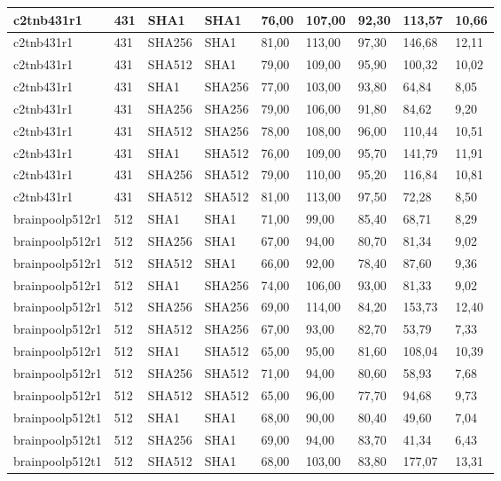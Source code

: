 \begin{longtable}{| l | l | l | l | l |l |l |l |l |}
c2tnb431r1 & 431 & SHA1 & SHA1 & 76,00 & 107,00 & 92,30 & 113,57 & 10,66 \\ \hline 
c2tnb431r1 & 431 & SHA256 & SHA1 & 81,00 & 113,00 & 97,30 & 146,68 & 12,11 \\ \hline 
c2tnb431r1 & 431 & SHA512 & SHA1 & 79,00 & 109,00 & 95,90 & 100,32 & 10,02 \\ \hline 
c2tnb431r1 & 431 & SHA1 & SHA256 & 77,00 & 103,00 & 93,80 & 64,84 & 8,05 \\ \hline 
c2tnb431r1 & 431 & SHA256 & SHA256 & 79,00 & 106,00 & 91,80 & 84,62 & 9,20 \\ \hline 
c2tnb431r1 & 431 & SHA512 & SHA256 & 78,00 & 108,00 & 96,00 & 110,44 & 10,51 \\ \hline 
c2tnb431r1 & 431 & SHA1 & SHA512 & 76,00 & 109,00 & 95,70 & 141,79 & 11,91 \\ \hline 
c2tnb431r1 & 431 & SHA256 & SHA512 & 79,00 & 110,00 & 95,20 & 116,84 & 10,81 \\ \hline 
c2tnb431r1 & 431 & SHA512 & SHA512 & 81,00 & 113,00 & 97,50 & 72,28 & 8,50 \\ \hline 
brainpoolp512r1 & 512 & SHA1 & SHA1 & 71,00 & 99,00 & 85,40 & 68,71 & 8,29 \\ \hline 
brainpoolp512r1 & 512 & SHA256 & SHA1 & 67,00 & 94,00 & 80,70 & 81,34 & 9,02 \\ \hline 
brainpoolp512r1 & 512 & SHA512 & SHA1 & 66,00 & 92,00 & 78,40 & 87,60 & 9,36 \\ \hline 
brainpoolp512r1 & 512 & SHA1 & SHA256 & 74,00 & 106,00 & 93,00 & 81,33 & 9,02 \\ \hline 
brainpoolp512r1 & 512 & SHA256 & SHA256 & 69,00 & 114,00 & 84,20 & 153,73 & 12,40 \\ \hline 
brainpoolp512r1 & 512 & SHA512 & SHA256 & 67,00 & 93,00 & 82,70 & 53,79 & 7,33 \\ \hline 
brainpoolp512r1 & 512 & SHA1 & SHA512 & 65,00 & 95,00 & 81,60 & 108,04 & 10,39 \\ \hline 
brainpoolp512r1 & 512 & SHA256 & SHA512 & 71,00 & 94,00 & 80,60 & 58,93 & 7,68 \\ \hline 
brainpoolp512r1 & 512 & SHA512 & SHA512 & 65,00 & 96,00 & 77,70 & 94,68 & 9,73 \\ \hline 
brainpoolp512t1 & 512 & SHA1 & SHA1 & 68,00 & 90,00 & 80,40 & 49,60 & 7,04 \\ \hline 
brainpoolp512t1 & 512 & SHA256 & SHA1 & 69,00 & 94,00 & 83,70 & 41,34 & 6,43 \\ \hline 
brainpoolp512t1 & 512 & SHA512 & SHA1 & 68,00 & 103,00 & 83,80 & 177,07 & 13,31 \\ \hline 

\end{longtable}

